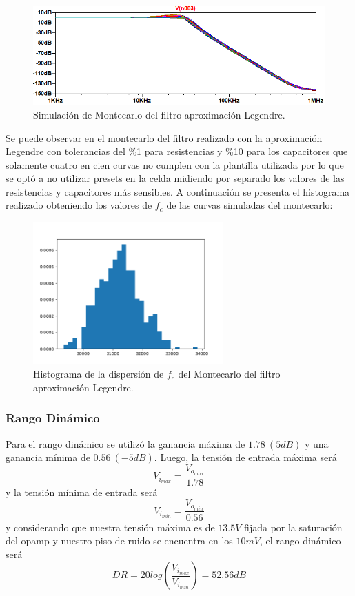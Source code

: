 \begin{figure}[H]
\centering
	\centering
	\includegraphics[width=\textwidth]{Imagenes-Ej1/legendre_mont.png}
	\caption{Simulación de Montecarlo del filtro aproximación Legendre.}
	\label{leg_mont_sim}
\end{figure}

Se puede observar en el montecarlo del filtro realizado con la aproximación Legendre con tolerancias del \%1  para resistencias y \%10 para los capacitores que solamente cuatro en cien curvas no cumplen con la plantilla utilizada por lo que se optó a no utilizar presets en la celda midiendo por separado los valores de las resistencias y capacitores más sensibles. A continuación se presenta el histograma realizado obteniendo los valores de $f_c$ de las curvas simuladas del montecarlo:

\begin{figure}[H]
\centering
	\centering
	\includegraphics[width=0.65\textwidth]{Imagenes-Ej1/histo_leg.png}
	\caption{Histograma de la dispersión de $f_c$ del Montecarlo del filtro aproximación Legendre.}
\end{figure}

\subsubsection{Rango Dinámico}

Para el rango dinámico se utilizó la ganancia máxima de $1.78 \ (5dB)$ y una ganancia mínima de $0.56 \ (-5dB)$. Luego, la tensión de entrada máxima será
\begin{equation}
V_{i_{max}}= \frac{V_{o_{max}}}{1.78}
\end{equation}
y la tensión mínima de entrada será
\begin{equation}
V_{i_{min}}= \frac{V_{o_{min}}}{0.56}
\end{equation}
y considerando que nuestra tensión máxima es de $13.5V$ fijada por la saturación del opamp y nuestro piso de ruido se encuentra en los $10mV$, el rango dinámico será
\begin{equation}
DR=20log(\frac{V_{i_{max}}}{V_{i_{min}}}) = 52.56dB
\end{equation}


